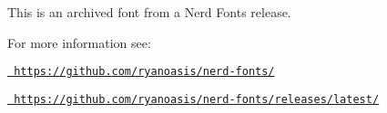 This is an archived font from a Nerd Fonts release.

For more information see\+:
\begin{DoxyItemize}
\item \href{https://github.com/ryanoasis/nerd-fonts/}{\texttt{ https\+://github.\+com/ryanoasis/nerd-\/fonts/}}
\item \href{https://github.com/ryanoasis/nerd-fonts/releases/latest/}{\texttt{ https\+://github.\+com/ryanoasis/nerd-\/fonts/releases/latest/}} 
\end{DoxyItemize}